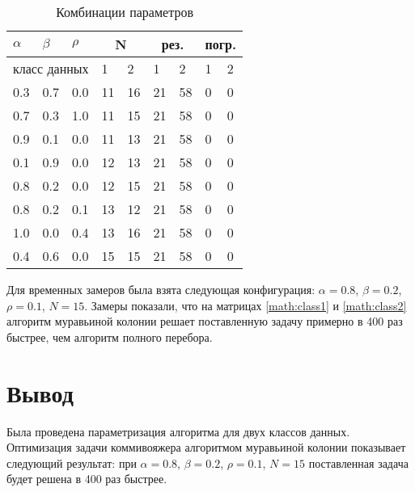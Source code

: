 \begin{table}[!h]
    \centering
    \renewcommand{\arraystretch}{1.2}
    \caption{Комбинации параметров}
    \begin{tabular}{||p{}p{}p{}p{}p{}p{}p{}p{}p{}||}
        \hline
        $\alpha$ & $\beta$ & $\rho$ & \multicolumn{2}{c}{N} & \multicolumn{2}{c}{рез.} & \multicolumn{2}{c||}{погр.} \\
        \hline
        \multicolumn{3}{||c}{класс данных} & 1 & 2 & 1 & 2 & 1 & 2 \\ \hline\hline
        0.3 & 0.7 & 0.0 & 11 & 16 & 21 & 58 & 0 & 0 \\ 
        0.7 & 0.3 & 1.0 & 11 & 15 & 21 & 58 & 0 & 0 \\ 
        0.9 & 0.1 & 0.0 & 11 & 13 & 21 & 58 & 0 & 0 \\ 
        0.1 & 0.9 & 0.0 & 12 & 13 & 21 & 58 & 0 & 0 \\ 
        0.8 & 0.2 & 0.0 & 12 & 15 & 21 & 58 & 0 & 0 \\ 
        0.8 & 0.2 & 0.1 & 13 & 12 & 21 & 58 & 0 & 0 \\ 
        1.0 & 0.0 & 0.4 & 13 & 16 & 21 & 58 & 0 & 0 \\ 
        0.4 & 0.6 & 0.0 & 15 & 15 & 21 & 58 & 0 & 0 \\ 
        \hline
    \end{tabular}
        
    \label{tab:classes-res}
\end{table}

Для временных замеров была взята следующая конфигурация: $\alpha = 0.8$, $\beta = 0.2$, $\rho = 0.1$, $N = 15$. Замеры показали, что на матрицах \ref{math:class1} и \ref{math:class2} алгоритм муравьиной колонии решает поставленную задачу примерно в 400 раз быстрее, чем алгоритм полного перебора. 

\section{Вывод}\label{sec:exp-sum}
Была проведена параметризация алгоритма для двух классов данных. Оптимизация задачи коммивояжера алгоритмом муравьиной колонии показывает следующий результат: при $\alpha = 0.8$, $\beta = 0.2$, $\rho = 0.1$, $N = 15$ поставленная задача будет решена в 400 раз быстрее. 